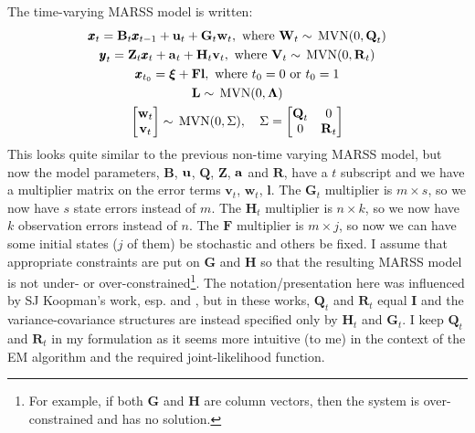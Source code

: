 \documentclass[]{article}
\def\xixi{\mbox{\boldmath $\xi$}}
\def\LAM{\mbox{\boldmath $\Lambda$}}
\def\UPS{\mbox{\boldmath $\Upsilon$}}
\def\XI{\mbox{\boldmath $\Xi$}}
\def\BB{\mbox{$\mathbf B$}}	\def\bb{\mbox{$\mathbf b$}} \def\Bb{\mbox{$\mathbf J$}} \def\Ba{\mbox{$\mathbf L$}} \def\Bm{\UPS}
\def\FF{\mbox{$\mathbf F$}} \def\ff{\mbox{$\mathbf f$}}
\def\GG{\mbox{$\mathbf G$}}	\def\gg{\mbox{$\mathbf g$}}
\def\HH{\mbox{$\mathbf H$}}	\def\hh{\mbox{$\mathbf h$}}
\def\II{\mbox{$\mathbf I$}} \def\ii{\mbox{$\mathbf i$}}
\def\LL{\mbox{$\mathbf L$}}	\def\ll{\mbox{$\mathbf l$}}
\def\MVN{\,\textup{\textrm{MVN}}}
\def\QQ{\mbox{$\mathbf Q$}}	 \def\qq{\mbox{$\mathbf q$}} \def\Qb{\mbox{$\mathbf G$}}  \def\Qm{\mathbb{Q}}
\def\RR{\mbox{$\mathbf R$}}	 \def\rr{\mbox{$\mathbf r$}} \def\Rb{\mbox{$\mathbf H$}}	\def\Rm{\mathbb{R}}
\def\VV{\mbox{$\mathbf V$}}	\def\vv{\mbox{$\mathbf v$}}
\def\WW{\mbox{$\mathbf W$}}	\def\ww{\mbox{$\mathbf w$}}
\def\ZZ{\mbox{$\mathbf Z$}}	\def\zz{\mbox{$\mathbf z$}}	\def\Zb{\mbox{$\mathbf M$}} \def\Za{\mbox{$\mathbf N$}} \def\Zm{\XI}
\begin{document}
The time-varying MARSS model is written:
\begin{subequations}\label{eq:MARSS.ex2}
\begin{gather}
\xx_t = \BB_t\xx_{t-1} + \uu_t + \GG_t\ww_t, \text{ where } \WW_t \sim \MVN(0,\QQ_t)\\
\yy_t = \ZZ_t\xx_t + \aa_t + \HH_t\vv_t, \text{ where } \VV_t \sim \MVN(0,\RR_t)\\
\xx_{t_0} = \xixi+\FF\ll, \text{ where } t_0=0 \text{ or } t_0=1\\
\LL \sim \MVN(0,\LAM)\\
\begin{bmatrix}\ww_t\\ \vv_t\end{bmatrix} \sim \MVN(0,\Sigma), \quad \Sigma=\begin{bmatrix}\QQ_t&0\\ 0&\RR_t\end{bmatrix}
\end{gather}
\end{subequations}
This looks quite similar to the previous non-time varying MARSS model, but now the model parameters, $\BB$, $\uu$, $\QQ$, $\ZZ$, $\aa$ and $\RR$, have a $t$ subscript and we have a multiplier matrix on the error terms $\vv_t$, $\ww_t$, $\ll$. The $\GG_t$ multiplier is $m \times s$, so we now have $s$ state errors instead of $m$.  The $\HH_t$ multiplier is $n \times k$, so we now have $k$ observation errors instead of $n$.  The $\FF$ multiplier is $m \times j$, so now we can have some initial states ($j$ of them) be stochastic and others be fixed.  I assume that appropriate constraints are put on $\GG$ and $\HH$ so that the resulting MARSS model is not under- or over-constrained\footnote{For example, if both $\GG$ and $\HH$ are column vectors, then the system is over-constrained and has no solution.}.
The notation/presentation here was influenced by SJ Koopman's work, esp. \citet{KoopmanOoms2011} and \citet{Koopman1993}, but in these works, $\QQ_t$ and $\RR_t$ equal $\II$ and the variance-covariance structures are instead specified only by $\HH_t$ and $\GG_t$.  I keep $\QQ_t$ and $\RR_t$ in my formulation as it seems more intuitive (to me) in the context of the EM algorithm and the required joint-likelihood function. 
\end{document}
